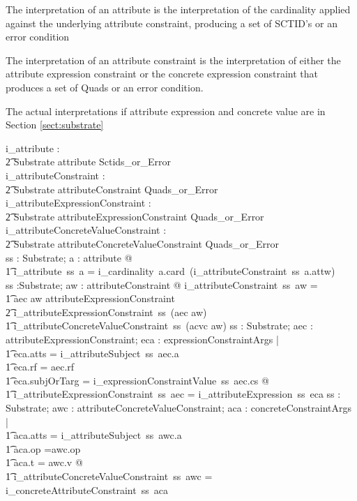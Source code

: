 \documentclass{article}
\begin{document}
The interpretation of an attribute is the interpretation of the cardinality applied against the
underlying attribute constraint, producing a set of SCTID's or an error condition

The interpretation of an attribute constraint is the interpretation of either the attribute expression
constraint or the concrete expression constraint that produces a set of Quads or an error condition.

The actual interpretations if attribute expression and concrete value are in Section \ref{sect:substrate}
\begin{gendef}
   i\_attribute : \\
\t2 Substrate \pfun attribute \pfun Sctids\_or\_Error \\
   i\_attributeConstraint : \\
\t2 Substrate \pfun attributeConstraint \pfun Quads\_or\_Error \\
   i\_attributeExpressionConstraint : \\
\t2 Substrate \pfun attributeExpressionConstraint \pfun Quads\_or\_Error \\
   i\_attributeConcreteValueConstraint : \\
\t2 Substrate \pfun attributeConcreteValueConstraint \pfun Quads\_or\_Error \\
\where
\forall ss : Substrate; a : attribute @ \\
\t1 i\_attribute~ss~a =  i\_cardinality~a.card~(i\_attributeConstraint~ss~a.attw) \\
\also
\forall ss :Substrate; aw : attributeConstraint @ i\_attributeConstraint~ss~aw = \\
\t1 \IF aec \inv aw \in attributeExpressionConstraint \\
\t2  \THEN i\_attributeExpressionConstraint~ss~(aec \inv aw) \\
\t1 \ELSE  i\_attributeConcreteValueConstraint~ss~(acvc \inv aw) 
 \also
\forall ss : Substrate; aec : attributeExpressionConstraint; eca : expressionConstraintArgs | \\
\t1 eca.atts = i\_attributeSubject~ss~aec.a \land \\
\t1 eca.rf = aec.rf \land \\
\t1 eca.subjOrTarg = i\_expressionConstraintValue~ss~aec.cs @ \\
\t1 i\_attributeExpressionConstraint~ss~aec = i\_attributeExpression~ss~eca
\also 
\forall ss : Substrate; awc : attributeConcreteValueConstraint; aca : concreteConstraintArgs | \\
\t1 aca.atts = i\_attributeSubject~ss~awc.a \land \\
\t1 aca.op =awc.op \land \\
\t1 aca.t = awc.v @ \\
\t1 i\_attributeConcreteValueConstraint~ss~awc = i\_concreteAttributeConstraint~ss~aca \\
\end{gendef}
\end{document}
